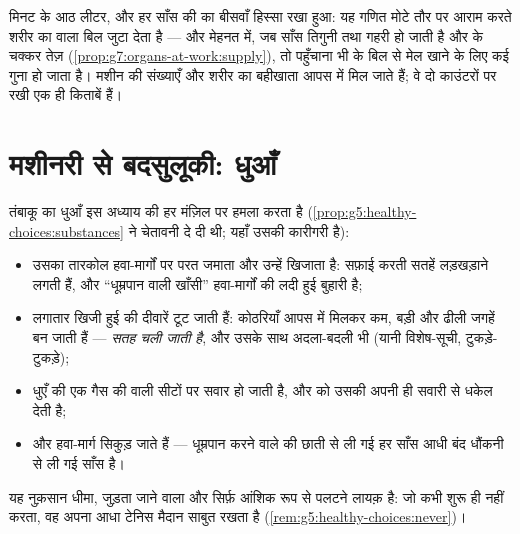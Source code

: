 \begin{example}[हिसाब मिल जाता है]\label{ex:g7:lungs-and-gas-exchange:accounting}
मिनट के आठ लीटर, और हर साँस की  का बीसवाँ हिस्सा रखा हुआ: यह
गणित मोटे तौर पर आराम करते शरीर का  वाला बिल जुटा देता है ---
और मेहनत में, जब साँस तिगुनी तथा गहरी हो जाती है और  के चक्कर तेज़
(\cref{prop:g7:organs-at-work:supply}), तो पहुँचाना भी  के बिल
से मेल खाने के लिए कई गुना हो जाता है। मशीन की संख्याएँ और शरीर का
बहीखाता आपस में मिल जाते हैं; वे दो काउंटरों पर रखी एक ही किताबें हैं।
\end{example}

\section{मशीनरी से बदसुलूकी: धुआँ}

\begin{proposition}[धुआँ इस कारख़ाने का क्या करता है]\label{prop:g7:lungs-and-gas-exchange:smoke}
तंबाकू का धुआँ इस अध्याय की हर मंज़िल पर हमला करता है
(\cref{prop:g5:healthy-choices:substances} ने चेतावनी दे दी थी; यहाँ
उसकी कारीगरी है):
\begin{itemize}
  \item उसका तारकोल हवा-मार्गों पर परत जमाता और उन्हें खिजाता है:
        सफ़ाई करती सतहें लड़खड़ाने लगती हैं, और ``धूम्रपान वाली खाँसी''
        हवा-मार्गों की लदी हुई बुहारी है;
  \item लगातार खिजी हुई  की दीवारें टूट जाती हैं: कोठरियाँ
        आपस में मिलकर कम, बड़ी और ढीली जगहें बन जाती हैं ---
        \emph{सतह चली जाती है}, और उसके साथ अदला-बदली भी (यानी
        विशेष-सूची, टुकड़े-टुकड़े);
  \item धुएँ की एक गैस  की  वाली सीटों पर सवार हो जाती है,
        और  को उसकी अपनी ही सवारी से धकेल देती है;
  \item और हवा-मार्ग सिकुड़ जाते हैं --- धूम्रपान करने वाले की छाती से
        ली गई हर साँस आधी बंद धौंकनी से ली गई साँस है।
\end{itemize}
यह नुक़सान धीमा, जुड़ता जाने वाला और सिर्फ़ आंशिक रूप से पलटने लायक़
है: जो  कभी शुरू ही नहीं करता, वह अपना आधा टेनिस मैदान साबुत रखता
है (\cref{rem:g5:healthy-choices:never})।
\end{proposition}
\admitted

